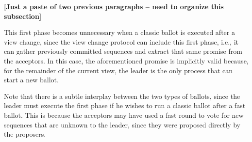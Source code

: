 {\bf [Just a paste of two previous paragraphs -- need to organize this subsection]}

 This first phase becomes unnecessary when a classic ballot is executed after a view change, since the view change protocol can include this first phase, i.e., it can gather previously committed sequences and extract that same promise from the acceptors. In this case, the aforementioned promise is implicitly valid because, for the remainder of the current view, the leader is the only process that can start a new ballot.

 Note that there is a subtle interplay between the two types of ballots, since the leader must execute the first phase if he wishes to run a classic ballot after a fast ballot. This is because the acceptors may have used a fast round to vote for new sequences that are unknown to the leader, since they were proposed directly by the proposers.
\fi